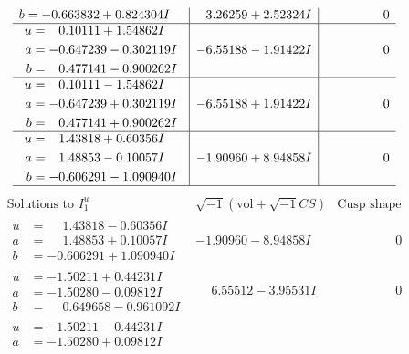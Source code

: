 \documentclass[1p]{elsarticle_modified}
\theoremstyle{definition}
\newcommand{\I}{\sqrt{-1}}
\begin{document}
$$\begin{array}{c|c|c}
\begin{aligned}
b &= -0.663832 + 0.824304 I\end{aligned}
 & \phantom{-}3.26259 + 2.52324 I & \phantom{-0.000000 } 0 \\ \hline\begin{aligned}
u &= \phantom{-}0.10111 + 1.54862 I \\
a &= -0.647239 - 0.302119 I \\
b &= \phantom{-}0.477141 - 0.900262 I\end{aligned}
 & -6.55188 - 1.91422 I & \phantom{-0.000000 } 0 \\ \hline\begin{aligned}
u &= \phantom{-}0.10111 - 1.54862 I \\
a &= -0.647239 + 0.302119 I \\
b &= \phantom{-}0.477141 + 0.900262 I\end{aligned}
 & -6.55188 + 1.91422 I & \phantom{-0.000000 } 0 \\ \hline\begin{aligned}
u &= \phantom{-}1.43818 + 0.60356 I \\
a &= \phantom{-}1.48853 - 0.10057 I \\
b &= -0.606291 - 1.090940 I\end{aligned}
 & -1.90960 + 8.94858 I & \phantom{-0.000000 } 0\\
 \hline 
 \end{array}$$\newpage$$\begin{array}{c|c|c}  
\text{Solutions to }I^u_{1}& \I (\text{vol} + \sqrt{-1}CS) & \text{Cusp shape}\\
 \hline 
\begin{aligned}
u &= \phantom{-}1.43818 - 0.60356 I \\
a &= \phantom{-}1.48853 + 0.10057 I \\
b &= -0.606291 + 1.090940 I\end{aligned}
 & -1.90960 - 8.94858 I & \phantom{-0.000000 } 0 \\ \hline\begin{aligned}
u &= -1.50211 + 0.44231 I \\
a &= -1.50280 - 0.09812 I \\
b &= \phantom{-}0.649658 - 0.961092 I\end{aligned}
 & \phantom{-}6.55512 - 3.95531 I & \phantom{-0.000000 } 0 \\ \hline\begin{aligned}
u &= -1.50211 - 0.44231 I \\
a &= -1.50280 + 0.09812 I \\

\end{aligned}
\end{array}$$
\end{document}
